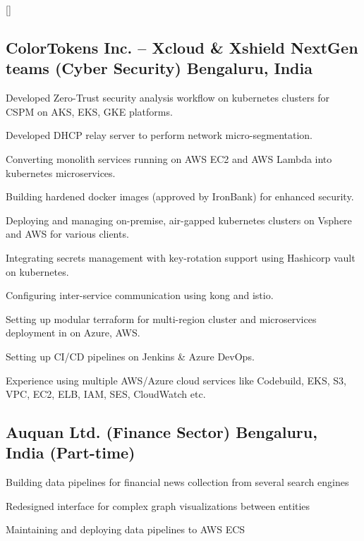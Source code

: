 \documentclass[letter,10pt]{article}
\begin{document}
\titlespacing*{\subsubsection}{0em}{0em}{0em}
\titleformat{\subsubsection}{\itshape}{}{0em}{}[]


\subsection{ColorTokens Inc. -- Xcloud \& Xshield NextGen teams (Cyber Security) \hfill Bengaluru, India}
\begin{zitemize}
    \item Developed Zero-Trust security analysis workflow on kubernetes clusters for CSPM
    on AKS, EKS, GKE platforms.
    \item Developed DHCP relay server to perform network micro-segmentation.
    \item Converting monolith services running on AWS EC2 and AWS Lambda into kubernetes
    microservices.
    \item Building hardened docker images (approved by IronBank) for enhanced security.
    \item Deploying and managing on-premise, air-gapped kubernetes clusters on Vsphere
    and AWS for various clients.
    \item Integrating secrets management with key-rotation support using Hashicorp vault
    on kubernetes.
    \item Configuring inter-service communication using kong and istio.
    \item Setting up modular terraform for multi-region cluster and microservices
    deployment in on Azure, AWS.
    \item Setting up CI/CD pipelines on Jenkins \& Azure DevOps.
    \item Experience using multiple AWS/Azure cloud services like Codebuild, EKS, S3,
    VPC, EC2, ELB, IAM, SES, CloudWatch etc.
\end{zitemize}


\subsection{Auquan Ltd. (Finance Sector) \hfill Bengaluru, India (Part-time)}
\begin{zitemize}
    \item Building data pipelines for financial news collection from several search
    engines
    \item Redesigned interface for complex graph visualizations between entities
    \item Maintaining and deploying data pipelines to AWS ECS
\end{zitemize}
\end{document}
